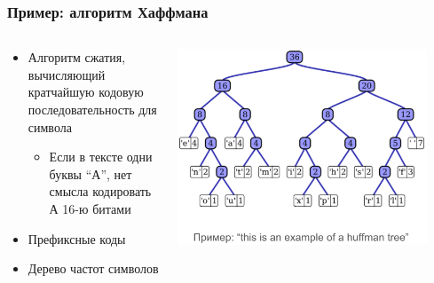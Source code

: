 \documentclass[xetex,mathserif,serif]{beamer}
\begin{document}
	\begin{frame}
		\frametitle{Пример: алгоритм Хаффмана}
		\begin{columns}
			\begin{column}{0.4\textwidth}
				\begin{itemize}
					\item Алгоритм сжатия, вычисляющий кратчайшую кодовую последовательность для символа
					\begin{itemize}
						\item Если в тексте одни буквы ``А'', нет смысла кодировать А 16-ю битами
					\end{itemize}
					\item Префиксные коды
					\item Дерево частот символов
				\end{itemize}
			\end{column}
			\begin{column}{0.6\textwidth}
				\begin{center}
					\includegraphics[width=0.9\textwidth]{huffmanTree.png}
				\end{center}
			\end{column}
		\end{columns}
	\end{frame}
\end{document}
